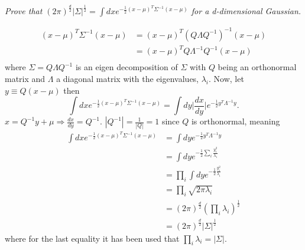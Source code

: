 \begin{example}
	\emph{Prove that $(2\pi)^\frac{d}{2}|\Sigma|^{\frac{1}{2}}=\int dx e^{-\frac{1}{2}(x-\mu)^T\Sigma^{-1}(x-\mu)}$ for a d-dimensional Gaussian.}
	
	\begin{equation}
		\begin{split}
			(x-\mu)^T\Sigma^{-1}(x-\mu) & = (x-\mu)^T(Q\Lambda Q^{-1})^{-1}(x-\mu)\\
			&= (x-\mu)^TQ\Lambda^{-1}Q^{-1}(x-\mu)\\
		\end{split}
	\end{equation}
	where $\Sigma= Q\Lambda Q^{-1}$ is an eigen decomposition of $\Sigma$ with $Q$ being an orthonormal matrix and $\Lambda$ a diagonal matrix with the eigenvalues, $\lambda_i$. Now, let $y\equiv Q(x-\mu)$ then
	\begin{equation}
		\int dx e^{-\frac{1}{2}(x-\mu)^T\Sigma^{-1}(x-\mu)} = \int dy \bigg|\frac{dx}{dy}\bigg|e^{-\frac{1}{2}y^T\Lambda^{-1}y}.
	\end{equation}
	$x=Q^{-1}y+\mu\Rightarrow \frac{dx}{dy}=Q^{-1}$. $|Q^{-1}|=\frac{1}{|Q|}=1$ since $Q$ is orthonormal, meaning
	\begin{equation}
		\begin{split}
			\int dx e^{-\frac{1}{2}(x-\mu)^T\Sigma^{-1}(x-\mu)} &= \int dy e^{-\frac{1}{2}y^T\Lambda^{-1}y}\\
			&= \int dy e^{-\frac{1}{2}\sum_i\frac{y_i^2}{\lambda_i}}\\
			&= \prod_i\int dy e^{-\frac{1}{2}\frac{y_i^2}{\lambda_i}}\\
			& = \prod_i \sqrt{2\pi \lambda_i}\\
			& = (2\pi)^\frac{d}{2}(\prod_i\lambda_i)^\frac{1}{2}\\
			& = (2\pi)^\frac{d}{2}|\Sigma|^{\frac{1}{2}}
		\end{split}
	\end{equation}
	where for the last equality it has been used that $\prod_i\lambda_i=|\Sigma|$.
\end{example}
